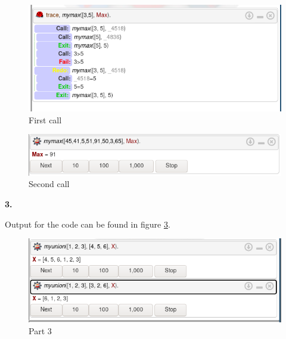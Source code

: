 \documentclass[letterpaper, 11pt]{article}
\newcommand{\hwnumber}[1]{\medskip \noindent\textbf{#1.} \smallskip}
\begin{document}
\begin{figure}[h]
	\includegraphics[width=\linewidth]{proj3_q2.png}
	\centering
	\caption{First call}
	\label{fig:one}
\end{figure}
\begin{figure}[h]
	\includegraphics[width=\linewidth]{proj3_q2B.png}
	\centering
	\caption{Second call}
	\label{fig:two}
\end{figure}

\newpage
\hwnumber{3}

Output for the code can be found in figure \ref{fig:third}. 
\begin{figure}[h]
	\includegraphics[width=\linewidth]{proj3_q3.png}
	\centering
	\caption{Part 3}
	\label{fig:third}
\end{figure}
\end{document}
